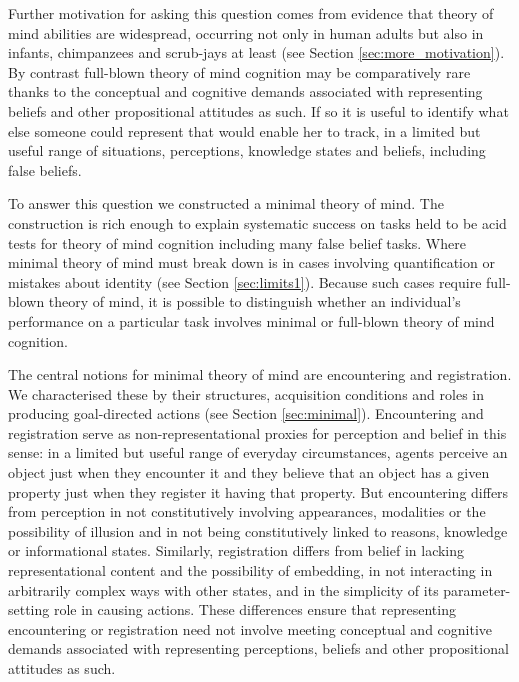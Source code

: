 \documentclass[12pt,\papersize]{extarticle}
\begin{document}
Further motivation for asking this question comes from  evidence that theory of mind abilities are widespread, occurring not only in human adults but also in infants, chimpanzees and scrub-jays at least (see Section \ref{sec:more_motivation}).
By contrast full-blown theory of mind cognition may be comparatively rare 
thanks to the conceptual and cognitive demands associated with representing beliefs and other propositional attitudes as such.  
If so it is useful to identify what else someone could represent that would enable her to track, in a limited but useful range of situations, perceptions, knowledge states and beliefs, including false beliefs.  

To answer this question we constructed a minimal theory of mind.  The construction is  rich enough to explain systematic success on tasks held to be acid tests for theory of mind cognition including many false belief tasks.  
Where minimal theory of mind must break down is in cases involving quantification or mistakes about identity (see Section \ref{sec:limits1}).  
Because such cases require full-blown theory of mind, it is possible to distinguish whether an individual’s performance on a particular task involves minimal or full-blown theory of mind cognition. 

The central notions for minimal theory of mind are encountering and registration.  We characterised these by their structures, acquisition conditions and roles in producing goal-directed actions (see Section \ref{sec:minimal}).  Encountering and registration serve as non-representational proxies for perception and belief in this sense: in a limited but useful range of everyday circumstances, agents perceive an object just when they encounter it and they believe that an object has a given property just when they register it having that property.  But encountering differs from perception in not constitutively involving appearances, modalities or the possibility of illusion and in not being constitutively linked to reasons, knowledge or informational states.  Similarly, registration differs from belief in lacking representational content and the possibility of embedding, in not interacting in arbitrarily complex ways with other states, and in the simplicity of its parameter-setting role in causing actions.  These differences ensure that representing encountering or registration need not involve meeting conceptual and cognitive demands associated with representing perceptions, beliefs and other propositional attitudes as such.
\end{document}
